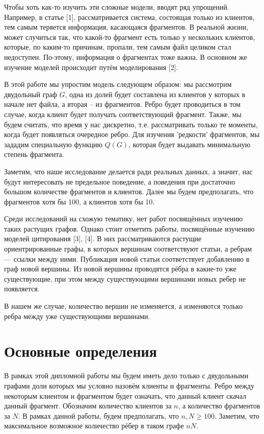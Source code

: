 \documentclass{matmex-diploma-custom}
\newcommand{\geqs}{\geqslant}
\theoremstyle{named}
\begin{document}
Чтобы хоть как-то изучить эти сложные модели, вводят ряд упрощений.
Например, в статье [1], рассматривается система, состоящая только из клиентов, тем самым теряется информация, касающаяся фрагментов.
В реальной жизни, может случиться так, что какой-то фрагмент есть только у нескольких клиентов, которые, 
по каким-то причинам, пропали, тем самым файл целиком стал недоступен.
По-этому, информация о фрагментах тоже важна. 
В основном же изучение моделей происходит путём моделирования [2].


В этой работе мы упростим модель следующем образом: мы рассмотрим двудольный граф $G$, 
одна из долей будет составлена из клиентов у которых в начале нет файла,
а вторая -- из фрагментов. Ребро будет проводиться в том случае, когда клиент будет получать соответствующий фрагмент.
Также, мы будем считать, что время у нас дискретно, т.е. рассматривать только те моменты, когда будет появляться очередное ребро.
Для изучения 'редкости' фрагментов, мы зададим специальную функцию $Q(G)$, которая будет выдавать минимальную степень фрагмента.

Заметим, что наше исследование делается ради реальных данных, а значит, нас будут интересовать не предельное поведение, 
а поведения при достаточно большом количестве фрагментов и клиентов. Далее мы будем предполагать, что фрагментов хотя бы 100, 
а клиентов хотя бы 10.

Среди исследований на схожую тематику, нет работ посвящённых изучению таких растущих графов.
Однако стоит отметить работы, посвящённые изучению моделей цитирования [3], [4]. 
В них рассматриваются растущие ориентрированные графы, в которых вершинам соответствуют статьи, а ребрам --- ссылки между ними. 
Публикация новой статьи соответствует добавлению в граф новой вершины.
Из новой вершины проводятся рёбра в какие-то уже существующие, при этом между существующими вершинами новых ребер не появляется.

В нашем же случае, количество вершин не изменяется, а изменяются только ребра между уже существующими вершинами.





\section*{Основные определения}
В рамках этой дипломной работы мы будем иметь дело только с двудольными графами доли которых мы условно назовём клиенты и фрагменты.
Ребро между некоторым клиентом и фрагментом будет означать, что данный клиент скачал данный фрагмент.
Обозначим количество клиентов за $n$, а количество фрагментов за $N$. В рамках данной работы, будем предполагать, что $n, N \geqs 100$.
Заметим, что максимальное возможное количество рёбер в таком графе $nN$.
\end{document}
